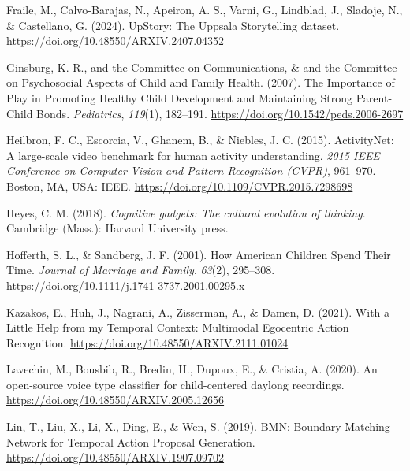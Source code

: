 \documentclass[
  man,floatsintext]{apa6}
\newlength{\cslhangindent}
\newenvironment{CSLReferences}[2] %
 {\begin{list}{}{%
  \setlength{\itemindent}{0pt}
  \setlength{\leftmargin}{0pt}
  \setlength{\parsep}{0pt}
  \ifodd #1
   \setlength{\leftmargin}{\cslhangindent}
   \setlength{\itemindent}{-1\cslhangindent}
  \fi
  \setlength{\itemsep}{#2\baselineskip}}}
 {\end{list}}
\begin{document}
\begin{CSLReferences}{1}{0}
Fraile, M., Calvo-Barajas, N., Apeiron, A. S., Varni, G., Lindblad, J., Sladoje, N., \& Castellano, G. (2024). {UpStory}: The {Uppsala Storytelling} dataset. \url{https://doi.org/10.48550/ARXIV.2407.04352}

Ginsburg, K. R., and the Committee on Communications, \& and the Committee on Psychosocial Aspects of Child and Family Health. (2007). The {Importance} of {Play} in {Promoting Healthy Child Development} and {Maintaining Strong Parent-Child Bonds}. \emph{Pediatrics}, \emph{119}(1), 182--191. \url{https://doi.org/10.1542/peds.2006-2697}

Heilbron, F. C., Escorcia, V., Ghanem, B., \& Niebles, J. C. (2015). {ActivityNet}: {A} large-scale video benchmark for human activity understanding. \emph{2015 {IEEE Conference} on {Computer Vision} and {Pattern Recognition} ({CVPR})}, 961--970. Boston, MA, USA: IEEE. \url{https://doi.org/10.1109/CVPR.2015.7298698}

Heyes, C. M. (2018). \emph{Cognitive gadgets: The cultural evolution of thinking}. Cambridge (Mass.): Harvard University press.

Hofferth, S. L., \& Sandberg, J. F. (2001). How {American Children Spend Their Time}. \emph{Journal of Marriage and Family}, \emph{63}(2), 295--308. \url{https://doi.org/10.1111/j.1741-3737.2001.00295.x}

Kazakos, E., Huh, J., Nagrani, A., Zisserman, A., \& Damen, D. (2021). With a {Little Help} from my {Temporal Context}: {Multimodal Egocentric Action Recognition}. \url{https://doi.org/10.48550/ARXIV.2111.01024}

Lavechin, M., Bousbib, R., Bredin, H., Dupoux, E., \& Cristia, A. (2020). An open-source voice type classifier for child-centered daylong recordings. \url{https://doi.org/10.48550/ARXIV.2005.12656}

Lin, T., Liu, X., Li, X., Ding, E., \& Wen, S. (2019). {BMN}: {Boundary-Matching Network} for {Temporal Action Proposal Generation}. \url{https://doi.org/10.48550/ARXIV.1907.09702}


\end{CSLReferences}
\end{document}
